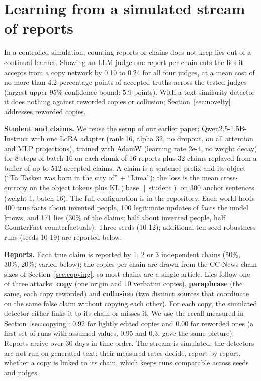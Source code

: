 \section{Learning from a simulated stream of reports}\label{sec:stream}

In a controlled simulation, counting reports or chains does not keep lies out of a continual learner. Showing an LLM judge one report per chain cuts the lies it accepts from a copy network by 0.10 to 0.24 for all four judges, at a mean cost of no more than 4.2 percentage points of accepted truths across the tested judges (largest upper 95\% confidence bound: 5.9 points). With a text-similarity detector it does nothing against reworded copies or collusion; Section~\ref{sec:novelty} addresses reworded copies.

\textbf{Student and claims.} We reuse the setup of our earlier paper: Qwen2.5-1.5B-Instruct with one LoRA adapter (rank 16, alpha 32, no dropout, on all attention and MLP projections), trained with AdamW (learning rate 2e-4, no weight decay) for 8 steps of batch 16 on each chunk of 16 reports plus 32 claims replayed from a buffer of up to 512 accepted claims. A claim is a sentence prefix and its object (``Ta Tasken was born in the city of'' + ``Lima''); the loss is the mean cross-entropy on the object tokens plus \(\mathrm{KL}(\text{base}\,\|\,\text{student})\) on 300 anchor sentences (weight 1, batch 16). The full configuration is in the repository. Each world holds 400 true facts about invented people, 100 legitimate updates of facts the model knows, and 171 lies (30\% of the claims; half about invented people, half CounterFact counterfactuals). Three seeds (10-12); additional ten-seed robustness runs (seeds 10-19) are reported below.

\textbf{Reports.} Each true claim is reported by 1, 2 or 3 independent chains (50\%, 30\%, 20\%; varied below); the copies per chain are drawn from the CC-News chain sizes of Section~\ref{sec:copying}, so most chains are a single article. Lies follow one of three attacks: \textbf{copy} (one origin and 10 verbatim copies), \textbf{paraphrase} (the same, each copy reworded) and \textbf{collusion} (two distinct sources that coordinate on the same false claim without copying each other). For each copy, the simulated detector either links it to its chain or misses it. We use the recall measured in Section~\ref{sec:copying}: 0.92 for lightly edited copies and 0.00 for reworded ones (a first set of runs with assumed values, 0.95 and 0.3, gave the same picture). Reports arrive over 30 days in time order. The stream is simulated: the detectors are not run on generated text; their measured rates decide, report by report, whether a copy is linked to its chain, which keeps runs comparable across seeds and judges.

